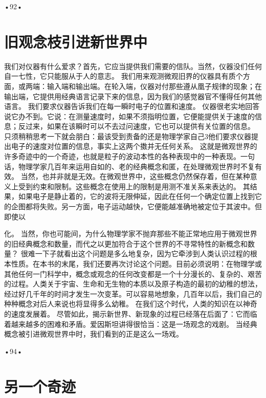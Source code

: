 •92•
  
\section{旧观念枝引进新世界中}

我们对仪器有什么爱求？首先，它应当提供我们需要的信队。当然，仪器没们任何自一七性，它只能服从于人的意志。
我们用来观测微观旧界的仪器具有质个方面，或两端：输入端和输出端。在轮入端，仪器对付那些遵从凰子规律的现象；在输出端，它提供用经典语言记录下来的信息，因为我们的感觉器官不懂得任何其他语言。
我们要求仪器告诉我们在每一瞬时电子的位置和速度。
仪器很老实地回答说它办不到。它说：在测量速度时，如果不须指明位置，它便能提供关于速度的信息；反过来，如果在该瞬时可以不去过问速度，它也可以提供有关位置的信息。
只须稍稍思考一下就会朋白：最该受到责备的还是物理学家自己3他们要求仪器提出电子的速度对位置的信息，事实上这两个擞并无任何关系。
这就是微观世界的许多奇迹中的一个奇迹，也就是粒子的波动本性的各种表现中的一种表现。一句话，物理学家几百年来运用自如的、老的经典概念和匿，在处理微观世界时不复有效。
当然，也并非就是无效。在微观世界中，这些概念仍然保存着，但在某种意义上受到约束和限制。这些概念在使用上的限制是用测不准关系来表达的。
其结果，如果电子是静止着的，它的波将无限伸延，因此在任何一个确定位置上找到它的企图都将失败。另一方面，电子运动越快，它便能越准确地被定位于其波中。但即使以


化。
当然，你也可能间，为什么物理学家不抛弃那些不能正常地应用于微观世界的旧经典概念和数量，而代之以更加符合于这个世界的不寻常特性的新概念和数量？
很难一下子就看出这个问题是多么地复杂，因为它牵涉到人类认识过程的根本性质。在本书的末尾，我们还要再次讨论这个问题。目前必须说明：在物理学或其他任何一门科学中，概念或观念的任何改变都是一个十分漫长的、复杂的、艰苦的过程。人类关于宇宙、生命和无生物的本质以及原子构造的最初的幼稚的想法，经过好几千年的时间才发生一次变革。可以容易地想象，几百年以后，我们自己的种种概念对后人来说也将显得多么幼稚。
在我们这个时代，人类的知识在以神奇的速度发展着。
尽管如此，揭示新世界、新现象的过程已经落在后面了：它而临着越来越多的困难和矛盾。爱因斯坦讲得很恰当：这是一场观念的戏剧。
当经典概念被引进微观世界中时，我们看到的正是这么一场戏。

•94•
  
\section{另一个奇迹}

